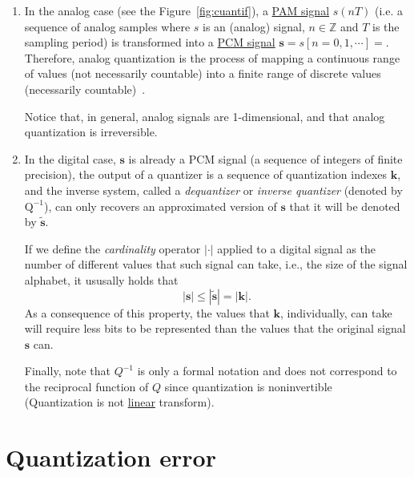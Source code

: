 \begin{enumerate}
\item In the analog case (see the Figure~\ref{fig:cuantif}), a
  \href{https://en.wikipedia.org/wiki/Pulse-amplitude_modulation}{PAM
    signal} $s(nT)$ (i.e. a sequence of analog samples
  where $s$ is an (analog) signal, $n\in{\mathbb{Z}}$ and $T$ is the
  sampling period) is transformed into a
  \href{https://en.wikipedia.org/wiki/Pulse-code_modulation}{PCM
    signal} ${\mathbf s}=s[n=0,1,\cdots]=$. Therefore, analog
  quantization is the process of mapping a continuous range of values
  (not necessarily countable) into a finite range of discrete values
  (necessarily countable)~\cite{vetterli1995wavelets}.

  Notice that, in general, analog signals are 1-dimensional, and that
  analog quantization is irreversible.
  
\item In the digital case, ${\mathbf s}$ is already a PCM signal (a
  sequence of integers of finite precision), the output of a quantizer
  is a sequence of quantization indexes ${\mathbf k}$, and the inverse
  system, called a \emph{dequantizer} or \emph{inverse quantizer}
  (denoted by $\text{Q}^{-1}$), can only recovers an approximated
  version of ${\mathbf s}$ that it will be denoted by $\tilde{\mathbf
    s}$.

  If we define the \emph{cardinality} operator $|\cdot|$ applied to a
  digital signal as the number of different values that such signal
  can take, i.e., the size of the signal alphabet, it ususally holds
  that
  \begin{equation}
    |{\mathbf s}|\leq|\tilde{\mathbf s}| = |{\mathbf k}|.
  \end{equation}
  As a consequence of this property, the values that ${\mathbf k}$,
  individually, can take will require less bits to be represented than
  the values that the original signal ${\mathbf s}$ can.

  Finally, note that $Q^{-1}$ is only a formal notation and does not
  correspond to the reciprocal function of $Q$ since quantization is
  noninvertible~\cite{duhamel2009joint} (Quantization is not
  \href{https://en.wikipedia.org/wiki/Linear_map}{linear} transform).
  
\end{enumerate}

\section{Quantization error}

